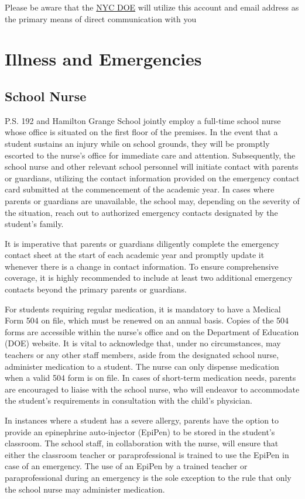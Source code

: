 \documentclass[11pt, letterpaper]{article}
\begin{document}
Please be aware that the \href{https://www.schools.nyc.gov}{NYC DOE} will utilize this account and email address as the primary means of direct communication with you

\section{Illness and Emergencies} 

\subsection{School Nurse} 
P.S. 192 and Hamilton Grange School jointly employ a full-time school nurse whose office is situated on the first floor of the premises. In the event that a student sustains an injury while on school grounds, they will be promptly escorted to the nurse's office for immediate care and attention. Subsequently, the school nurse and other relevant school personnel will initiate contact with parents or guardians, utilizing the contact information provided on the emergency contact card submitted at the commencement of the academic year. In cases where parents or guardians are unavailable, the school may, depending on the severity of the situation, reach out to authorized emergency contacts designated by the student's family.

It is imperative that parents or guardians diligently complete the emergency contact sheet at the start of each academic year and promptly update it whenever there is a change in contact information. To ensure comprehensive coverage, it is highly recommended to include at least two additional emergency contacts beyond the primary parents or guardians.

For students requiring regular medication, it is mandatory to have a Medical Form 504 on file, which must be renewed on an annual basis. Copies of the 504 forms are accessible within the nurse's office and on the Department of Education (DOE) website. It is vital to acknowledge that, under no circumstances, may teachers or any other staff members, aside from the designated school nurse, administer medication to a student. The nurse can only dispense medication when a valid 504 form is on file. In cases of short-term medication needs, parents are encouraged to liaise with the school nurse, who will endeavor to accommodate the student's requirements in consultation with the child's physician.

In instances where a student has a severe allergy, parents have the option to provide an epinephrine auto-injector (EpiPen) to be stored in the student's classroom. The school staff, in collaboration with the nurse, will ensure that either the classroom teacher or paraprofessional is trained to use the EpiPen in case of an emergency. The use of an EpiPen by a trained teacher or paraprofessional during an emergency is the sole exception to the rule that only the school nurse may administer medication.
\end{document}
